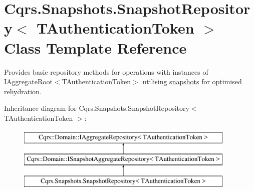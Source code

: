 \hypertarget{classCqrs_1_1Snapshots_1_1SnapshotRepository}{}\section{Cqrs.\+Snapshots.\+Snapshot\+Repository$<$ T\+Authentication\+Token $>$ Class Template Reference}
\label{classCqrs_1_1Snapshots_1_1SnapshotRepository}


Provides basic repository methods for operations with instances of I\+Aggregate\+Root$<$\+T\+Authentication\+Token$>$ utilising \hyperlink{classCqrs_1_1Snapshots_1_1Snapshot}{snapshots} for optimised rehydration.  


Inheritance diagram for Cqrs.\+Snapshots.\+Snapshot\+Repository$<$ T\+Authentication\+Token $>$\+:\begin{figure}[H]
\begin{center}
\leavevmode
\includegraphics[height=3.000000cm]{classCqrs_1_1Snapshots_1_1SnapshotRepository}
\end{center}
\end{figure}

